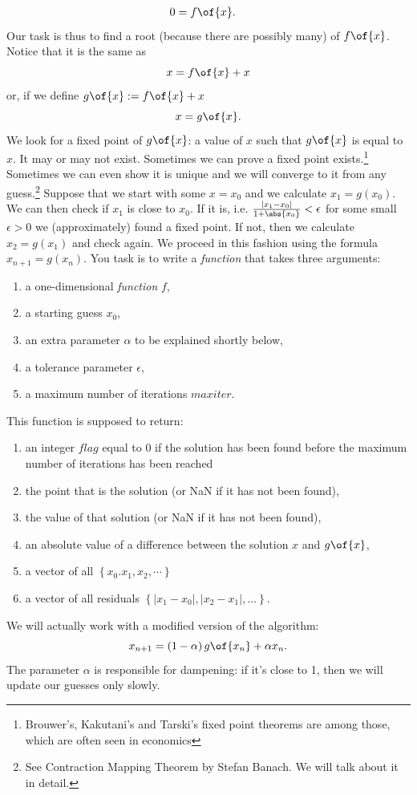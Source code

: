 \documentclass[english,hyperref={pdftex,pdfpagemode=UseNone,hidelinks}]{tufte-handout}
\begin{document}
\begin{align*}
0 & =f\of{x}.
\end{align*}
Our task is thus to find a root (because there are possibly many)
of $f\of{x}$. Notice that it is the same as 
\[
x=f\of{x}+x
\]
or, if we define $g\of{x}:=f\of{x}+x$ 
\[
x=g\of{x}.
\]
We look for a fixed point of $g\of{x}$: a value of $x$ such
that $g\of{x}$ is equal to $x$. It may or may not exist.
Sometimes we can prove a fixed point exists.\footnote{Brouwer's, Kakutani's and Tarski's fixed point theorems are among
those, which are often seen in economics} Sometimes we can even show it is unique and we will converge to it
from any guess.\footnote{See Contraction Mapping Theorem by Stefan Banach. We will talk about
it in detail.} Suppose that we start with some $x=x_{0}$ and we calculate $x_{1}=g\left(x_{0}\right)$.
We can then check if $x_{1}$ is close to $x_{0}$. If it is, i.e.
$\frac{\left|x_{1}-x_{0}\right|}{1+\abs{x_0}}<\epsilon$ for some small $\epsilon>0$
we (approximately) found a fixed point. If not, then we calculate
$x_{2}=g\left(x_{1}\right)$ and check again. We proceed in this fashion
using the formula $x_{n+1}=g\left(x_{n}\right)$. You task is to write
a \emph{function} that takes three arguments: 
\begin{enumerate}
\item a one-dimensional \emph{function} $f$, 
\item a starting guess $x_{0}$,
\item an extra parameter $\alpha$ to be explained shortly below, 
\item a tolerance parameter $\epsilon$, 
\item a maximum number of iterations $maxiter$. 
\end{enumerate}
This function is supposed to return: 
\begin{enumerate}
\item an integer $flag$ equal to 0 if the solution has been found before
the maximum number of iterations has been reached
\item the point that is the solution (or NaN if it has not been found),
\item the value of that solution (or NaN if it has not been found), 
\item an absolute value of a difference between the solution $x$ and $g\of{x}$, 
\item a vector of all $\left\{ x_{0}.x_{1},x_{2},\cdots\right\} $
\item a
vector of all residuals $\left\{ \left|x_{1}-x_{0}\right|,\left|x_{2}-x_{1}\right|,\ldots\right\} $.
\end{enumerate}
We will actually work with a modified version of the algorithm: 
\[
x_{n+1}=\left(1-\alpha\right)g\of{x_n}+\alpha x_{n}.
\]
The parameter $\alpha$ is responsible for dampening: if it's close
to 1, then we will update our guesses only slowly. 
\end{document}
